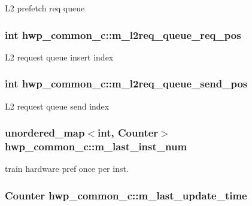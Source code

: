 \label{classhwp__common__c_ade1174fd9f09001b7805398b7f18c03b}
L2 prefetch req queue \hypertarget{classhwp__common__c_a255f0b4bdf74ba9042cdae97f7b43965}{
\subsubsection[{m\_\-l2req\_\-queue\_\-req\_\-pos}]{\setlength{\rightskip}{0pt plus 5cm}int {\bf hwp\_\-common\_\-c::m\_\-l2req\_\-queue\_\-req\_\-pos}}}
\label{classhwp__common__c_a255f0b4bdf74ba9042cdae97f7b43965}
L2 request queue insert index \hypertarget{classhwp__common__c_ac0fae9f4b6721765278811d618eb9629}{
\subsubsection[{m\_\-l2req\_\-queue\_\-send\_\-pos}]{\setlength{\rightskip}{0pt plus 5cm}int {\bf hwp\_\-common\_\-c::m\_\-l2req\_\-queue\_\-send\_\-pos}}}
\label{classhwp__common__c_ac0fae9f4b6721765278811d618eb9629}
L2 request queue send index \hypertarget{classhwp__common__c_ad87e4460ed484fc1657efb73917913c7}{
\subsubsection[{m\_\-last\_\-inst\_\-num}]{\setlength{\rightskip}{0pt plus 5cm}unordered\_\-map$<$int, Counter$>$ {\bf hwp\_\-common\_\-c::m\_\-last\_\-inst\_\-num}}}
\label{classhwp__common__c_ad87e4460ed484fc1657efb73917913c7}
train hardware pref once per inst. \hypertarget{classhwp__common__c_a0b833904c9a0040d1a2c7b257a2864da}{
\subsubsection[{m\_\-last\_\-update\_\-time}]{\setlength{\rightskip}{0pt plus 5cm}Counter {\bf hwp\_\-common\_\-c::m\_\-last\_\-update\_\-time}}}
